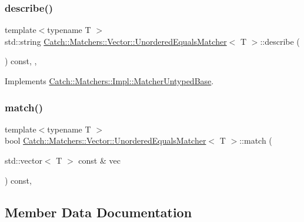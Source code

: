 \subsubsection{\texorpdfstring{describe()}{describe()}}
{\footnotesize\ttfamily template$<$typename T $>$ \\
std\+::string \mbox{\hyperlink{struct_catch_1_1_matchers_1_1_vector_1_1_unordered_equals_matcher}{Catch\+::\+Matchers\+::\+Vector\+::\+Unordered\+Equals\+Matcher}}$<$ T $>$\+::describe (\begin{DoxyParamCaption}{ }\end{DoxyParamCaption}) const\hspace{0.3cm}{\ttfamily [inline]}, {\ttfamily [override]}, {\ttfamily [virtual]}}



Implements \mbox{\hyperlink{class_catch_1_1_matchers_1_1_impl_1_1_matcher_untyped_base_a91d3a907dbfcbb596077df24f6e11fe2}{Catch\+::\+Matchers\+::\+Impl\+::\+Matcher\+Untyped\+Base}}.

\mbox{\label{struct_catch_1_1_matchers_1_1_vector_1_1_unordered_equals_matcher_a3ccdd9dd2cd8bdbb8bb121acbb9cb358}} 
\subsubsection{\texorpdfstring{match()}{match()}}
{\footnotesize\ttfamily template$<$typename T $>$ \\
bool \mbox{\hyperlink{struct_catch_1_1_matchers_1_1_vector_1_1_unordered_equals_matcher}{Catch\+::\+Matchers\+::\+Vector\+::\+Unordered\+Equals\+Matcher}}$<$ T $>$\+::match (\begin{DoxyParamCaption}\item[{std\+::vector$<$ T $>$ const \&}]{vec }\end{DoxyParamCaption}) const\hspace{0.3cm}{\ttfamily [inline]}, {\ttfamily [override]}}



\subsection{Member Data Documentation}
\mbox{\label{struct_catch_1_1_matchers_1_1_vector_1_1_unordered_equals_matcher_aaa39871eb4034d4335214215dd693712}} 

